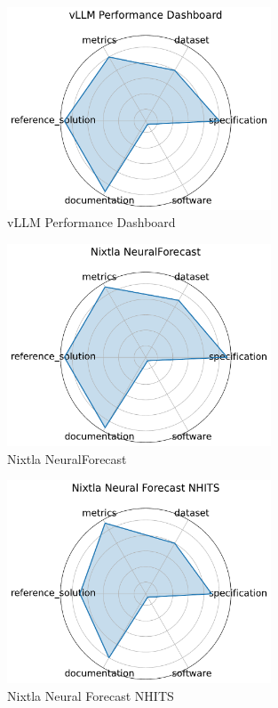 \documentclass{article}
\begin{document}
\begin{figure}[h!]
  \centering
  \includegraphics[width=0.7\textwidth]{vLLM Performance Dashboard_radar.pdf}
  \caption{vLLM Performance Dashboard \cite{mo2024vllm_dashboard}}
\end{figure}

\begin{figure}[h!]
  \centering
  \includegraphics[width=0.7\textwidth]{Nixtla NeuralForecast_radar.pdf}
  \caption{Nixtla NeuralForecast \cite{olivares2022library_neuralforecast}}
\end{figure}

\begin{figure}[h!]
  \centering
  \includegraphics[width=0.7\textwidth]{Nixtla Neural Forecast NHITS_radar.pdf}
  \caption{Nixtla Neural Forecast NHITS \cite{challu2023nhits}}
\end{figure}
\end{document}
